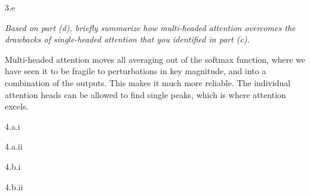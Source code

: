 
\clearpage

\LARGE
3.e
\normalsize

\textit{Based on part (d), briefly summarize how multi-headed attention overcomes the drawbacks of single-headed attention that you identified in part (c).}

\bigskip


\begin{answer}
    Multi-headed attention moves all averaging out of the softmax function, where we have seen it to be fragile to perturbations in key magnitude, and into a combination of the outputs. This makes it much more reliable. The individual attention heads can be allowed to find single peaks, which is where attention excels.
\end{answer}


\clearpage

\LARGE
4.a.i
\normalsize


\begin{answer}
\end{answer}


\clearpage

\LARGE
4.a.ii
\normalsize


\begin{answer}
\end{answer}


\clearpage

\LARGE
4.b.i
\normalsize


\begin{answer}
\end{answer}


\clearpage

\LARGE
4.b.ii
\normalsize


\begin{answer}
\end{answer}


\clearpage




